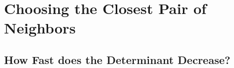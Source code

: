 \chapter{Choosing the Closest Pair of Neighbors}

\section{How Fast does the Determinant Decrease?}
